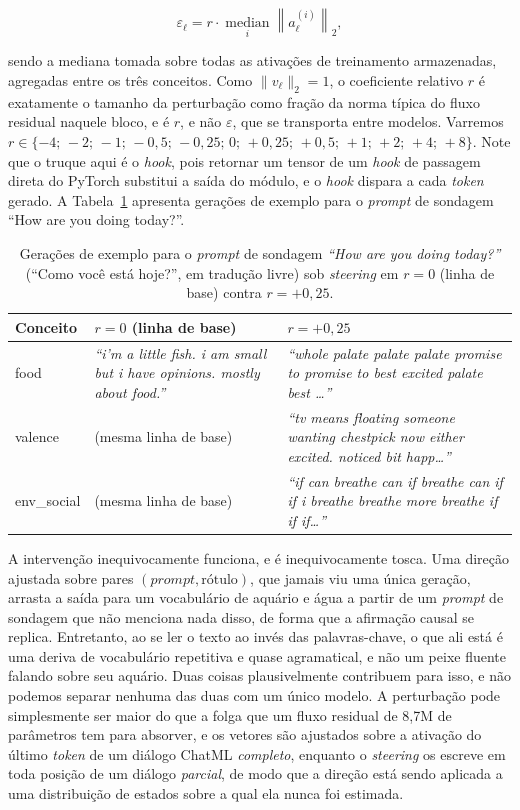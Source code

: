\[
  \varepsilon_\ell = r \cdot \operatorname*{median}_{i} \left\| a_\ell^{(i)} \right\|_2 ,
\]

sendo a mediana tomada sobre todas as ativações de treinamento armazenadas, agregadas
entre os três conceitos. Como $\|v_\ell\|_2 = 1$, o coeficiente relativo $r$ é exatamente
o tamanho da perturbação como fração da norma típica do fluxo residual naquele bloco, e é
$r$, e não $\varepsilon$, que se transporta entre modelos. Varremos
$r \in \{-4;\, -2;\, -1;\, -0{,}5;\, -0{,}25;\, 0;\, +0{,}25;\, +0{,}5;\, +1;\, +2;\, +4;\, +8\}$.
Note que o truque aqui é o \textit{hook}, pois retornar um tensor de um \textit{hook} de
passagem direta do PyTorch substitui a saída do módulo, e o \textit{hook} dispara a cada
\textit{token} gerado. A Tabela~\ref{tab:steering_samples} apresenta gerações de exemplo
para o \textit{prompt} de sondagem ``How are you doing today?''.

\begin{table}[htbp]
\centering
\caption{Gerações de exemplo para o \textit{prompt} de sondagem \textit{``How are you doing today?''} (``Como você está hoje?'', em tradução livre) sob \textit{steering} em $r=0$ (linha de base) contra $r=+0{,}25$.}
\label{tab:steering_samples}
\small
\begin{tabular}{@{}l p{5.5cm} p{5.5cm}@{}}
\toprule
\textbf{Conceito} & \textbf{$r = 0$ (linha de base)} & \textbf{$r = +0{,}25$} \\
\midrule
food &
\textit{``i'm a little fish. i am small but i have opinions. mostly about food.''} &
\textit{``whole palate palate palate promise to promise to best excited palate best \ldots''} \\
\addlinespace
valence &
(mesma linha de base) &
\textit{``tv means floating someone wanting chestpick now either excited. noticed bit happ\ldots''} \\
\addlinespace
env\_social &
(mesma linha de base) &
\textit{``if can breathe can if breathe can if if i breathe breathe more breathe if if if\ldots''} \\
\bottomrule
\end{tabular}
\end{table}

A intervenção inequivocamente funciona, e é inequivocamente tosca. Uma direção ajustada
sobre pares $(\textit{prompt}, \text{rótulo})$, que jamais viu uma única geração, arrasta a
saída para um vocabulário de aquário e água a partir de um \textit{prompt} de sondagem que
não menciona nada disso, de forma que a afirmação causal se replica. Entretanto, ao se ler
o texto ao invés das palavras-chave, o que ali está é uma deriva de vocabulário repetitiva
e quase agramatical, e não um peixe fluente falando sobre seu aquário. Duas coisas
plausivelmente contribuem para isso, e não podemos separar nenhuma das duas com um único
modelo. A perturbação pode simplesmente ser maior do que a folga que um fluxo residual de
8{,}7M de parâmetros tem para absorver, e os vetores são ajustados sobre a ativação do
último \textit{token} de um diálogo ChatML \emph{completo}, enquanto o \textit{steering} os
escreve em toda posição de um diálogo \emph{parcial}, de modo que a direção está sendo
aplicada a uma distribuição de estados sobre a qual ela nunca foi estimada.

